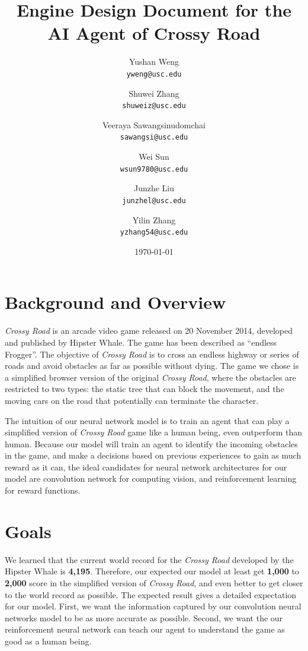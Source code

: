 \documentclass{article}
\title{Engine Design Document for the AI Agent of Crossy Road}
\author{
  Yushan Weng\\
  \texttt{yweng@usc.edu}
  \and
  Shuwei Zhang\\
  \texttt{shuweiz@usc.edu}
  \and
  Veeraya Sawangsinudomchai\\
  \texttt{sawangsi@usc.edu}
  \and
  Wei Sun\\
  \texttt{wsun9780@usc.edu}
  \and
  Junzhe Liu \\
  \texttt{junzhel@usc.edu}
  \and
  Yilin Zhang \\
  \texttt{yzhang54@usc.edu}
}
\date{\today}
\begin{document}
\maketitle

\tableofcontents

\section{Background and Overview}
\textit{Crossy Road} is an arcade video game released on 20 November 2014, developed and published by Hipster Whale. The game has been described as “endless Frogger”. The objective of \textit{Crossy Road} is to cross an endless highway or series of roads and avoid obstacles as far as possible without dying. The game we chose is a simplified browser version of the original \textit{Crossy Road}, where the obstacles are restricted to two types: the static tree that can block the movement, and the moving cars on the road that potentially can terminate the character.

The intuition of our neural network model is to train an agent that can play a simplified version of \textit{Crossy Road} game like a human being, even outperform than human. Because our model will train an agent to identify the incoming obstacles in the game, and make a decisions based on previous experiences to gain as much reward as it can, the ideal candidates for neural network architectures for our model are convolution network for computing vision, and reinforcement learning for reward functions. 



\section{Goals}
We learned that the current world record for the \textit{Crossy Road} developed by the Hipster Whale is \textbf{4,195}. Therefore, our expected our model at least get \textbf{1,000} to \textbf{2,000} score in the simplified version of \textit{Crossy Road}, and even better to get closer to the world record as possible. The expected result gives a detailed expectation for our model. First, we want the information captured by our convolution neural networks model to be as more accurate as possible. Second, we want the our reinforcement neural network can teach our agent to understand the game as good as a human being.
\end{document}
